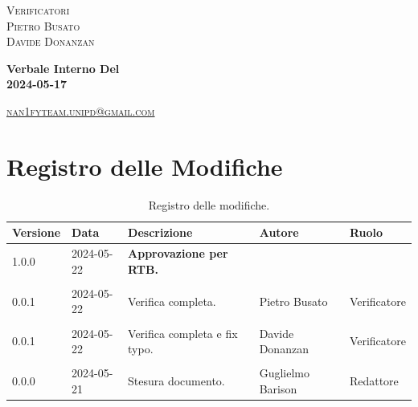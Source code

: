 \documentclass[8pt]{article}
\begin{document}
\begin{titlepage}
\begin{minipage}[t]{0.47\textwidth}
		{\large{\textsc{Verificatori}}
			\vspace{3mm}
			{\\\large{\textsc{Pietro Busato}\\}} %
			{\large{\textsc{Davide Donanzan}}}
			
		}
		\vspace{4mm}\vspace{4mm}
	\end{minipage}
	\vspace{4cm}
	\begin{center}
		\begin{flushright}
			{\fontsize{30pt}{52pt}\selectfont \textbf{Verbale Interno Del\\2024-05-17\\}} %
		\end{flushright}
		\vspace{3cm}
	\end{center}
	\vspace{8.2cm}
	{\small \textsc{\href{mailto: nan1fyteam.unipd@gmail.com}{nan1fyteam.unipd@gmail.com}}}
\end{titlepage}
\pagestyle{mystyle}
\section*{Registro delle Modifiche}
\begin{table}[ht!]	
	\centering
	\begin{tabular}{p{1.2cm} p{2cm} p{6cm} p{3cm} p{2cm}}
		\toprule
		\textbf{Versione}& \textbf{Data} & \textbf{Descrizione} & \textbf{Autore} & \textbf{Ruolo} \\
		\midrule
		1.0.0 & 2024-05-22 & \textbf{Approvazione per RTB.} & & \\\\
		0.0.1 & 2024-05-22 & Verifica completa. & Pietro Busato & Verificatore \\\\
		0.0.1 & 2024-05-22 & Verifica completa e fix typo. & Davide Donanzan & Verificatore \\\\
		0.0.0 & 2024-05-21 & Stesura documento. & Guglielmo Barison & Redattore \\
		\bottomrule
	\end{tabular}
	\caption{Registro delle modifiche.}
	\label{table:Registro delle modifiche}
\end{table}
\newpage
\tableofcontents
\clearpage
\newpage
\justifying
\end{document}

